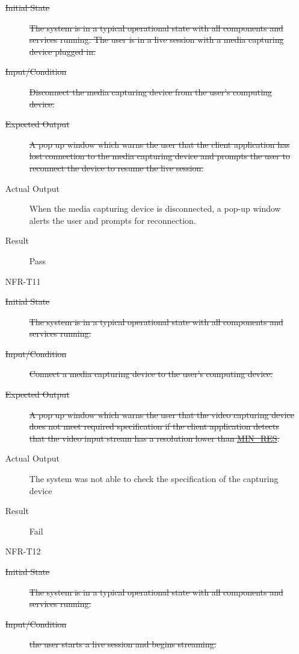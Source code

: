 \documentclass[12pt, titlepage]{article}
\begin{document}
\begin{enumerate}
\begin{description}
      \item[\sout{Initial State}]\sout{ The system is in a typical operational state with all
        components and services running. The user is in a live session with a
        media capturing device plugged in.
      }
      \item[\sout{Input/Condition}]\sout{ Disconnect the media capturing device from the user’s
        computing device.
      }
      \item[\sout{Expected Output}]\sout{ A pop up window which warns the user that the client
        application has lost connection to the media capturing device and prompts
        the user to reconnect the device to resume the live session.
      }
      \item[Actual Output] When the media capturing device is disconnected, a pop-up
        window alerts the user and prompts for reconnection.
      \item[Result] Pass
      \end{description}
    \item[NFR-T11] \label{NFRT11}
      \begin{description}
      \item[\sout{Initial State}]\sout{ The system is in a typical operational state with all
        components and services running.
      }
      \item[\sout{Input/Condition}]\sout{ Connect a media capturing device to the user’s computing
        device.
      }
      \item[\sout{Expected Output}]\sout{ A pop up window which warns the user that the video
        capturing device does not meet required specification if the client
        application detects that the video input stream has a resolution lower
        than \hyperref[const:res]{MIN\_RES}.
      }
      \item[Actual Output] The system was not able to check the specification of the
        capturing device
      \item[Result] Fail
      \end{description}
    \item[NFR-T12] \label{NFRT12}
      \begin{description}
      \item[\sout{Initial State}]\sout{ The system is in a typical operational state with all
        components and services running.
      }
      \item[\sout{Input/Condition}]\sout{ the user starts a live session and begins streaming.
}
\end{description}
\end{enumerate}
\end{document}
